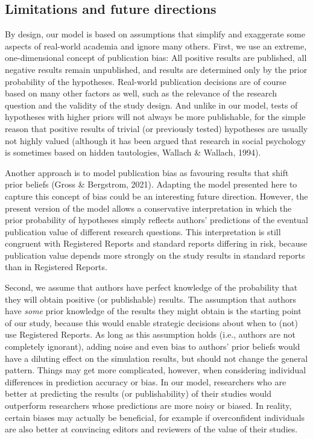 \documentclass[
  british,
  a4paper,
  ,man,mask,floatsintext]{apa6}
\begin{document}
\subsection{Limitations and future directions}\label{limitations-and-future-directions}

By design, our model is based on assumptions that simplify and exaggerate some aspects of real-world academia and ignore many others.
First, we use an extreme, one-dimensional concept of publication bias:
All positive results are published, all negative results remain unpublished, and results are determined only by the prior probability of the hypotheses.
Real-world publication decisions are of course based on many other factors as well, such as the relevance of the research question and the validity of the study design.
And unlike in our model, tests of hypotheses with higher priors will not always be more publishable, for the simple reason that positive results of trivial (or previously tested) hypotheses are usually not highly valued (although it has been argued that
research in social psychology is sometimes based on hidden tautologies, Wallach \& Wallach, 1994).

Another approach is to model publication bias as favouring results that shift prior beliefs (Gross \& Bergstrom, 2021).
Adapting the model presented here to capture this concept of bias could be an interesting future direction.
However, the present version of the model allows a conservative interpretation in which the prior probability of hypotheses simply reflects authors' predictions of the eventual publication value of different research questions.
This interpretation is still congruent with Registered Reports and standard reports differing in risk, because publication value depends more strongly on the study results in standard reports than in Registered Reports.

Second, we assume that authors have perfect knowledge of the probability that they will obtain positive (or publishable) results.
The assumption that authors have \emph{some} prior knowledge of the results they might obtain is the starting point of our study, because this would enable strategic decisions about when to (not) use Registered Reports.
As long as this assumption holds (i.e., authors are not completely ignorant), adding noise and even bias to authors' prior beliefs would have a diluting effect on the simulation results, but should not change the general pattern.
Things may get more complicated, however, when considering individual differences in
prediction accuracy or bias.
In our model, researchers who are better at predicting the results (or publishability) of their studies would outperform researchers whose predictions are more noisy or biased.
In reality, certain biases may actually be beneficial, for example if overconfident individuals are also better at convincing editors and reviewers of the value of their studies.
\end{document}
